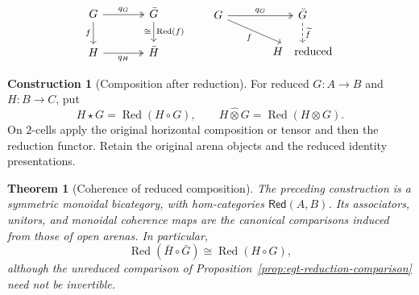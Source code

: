 \documentclass[11pt,a4paper]{article}
\numberwithin{equation}{section}
\newtheorem{theorem}{Theorem}[section]
\theoremstyle{definition}
\newtheorem{construction}[construction]{Construction}
\theoremstyle{remark}
\theoremstyle{plain}
\begin{document}
\[
\begin{tikzcd}[column sep=large]
 G\arrow[r,two heads,"q_G"]\arrow[d,"f"']&
 \bar G\arrow[d,"\operatorname{Red}(f)","\cong"']\\
 H\arrow[r,two heads,"q_H"']&\bar H
\end{tikzcd}
\qquad
\begin{tikzcd}[column sep=large]
 G\arrow[r,two heads,"q_G"]\arrow[dr,"f"']&
 \bar G\arrow[d,dashed,"\widetilde f"]\\
 &H\quad\text{reduced}
\end{tikzcd}
\]

\begin{construction}[Composition after reduction]
For reduced $G:A\to B$ and $H:B\to C$, put
\[
 H\star G=\operatorname{Red}(H\circ G),
 \qquad H\mathbin{\widehat\otimes}G
 =\operatorname{Red}(H\otimes G).
\]
On $2$-cells apply the original horizontal composition or tensor and
then the reduction functor. Retain the original arena objects and the
reduced identity presentations.
\end{construction}

\begin{theorem}[Coherence of reduced composition]
\label{thm:egt-reduced-coherence}
The preceding construction is a symmetric monoidal bicategory, with
hom-categories $\mathsf{Red}(A,B)$. Its associators, unitors, and
monoidal coherence maps are the canonical comparisons induced from
those of open arenas. In particular,
\[
 \operatorname{Red}(\bar H\circ\bar G)
 \cong\operatorname{Red}(H\circ G),
\]
although the unreduced comparison of
Proposition~\ref{prop:egt-reduction-comparison} need not be invertible.
\end{theorem}
\end{document}
